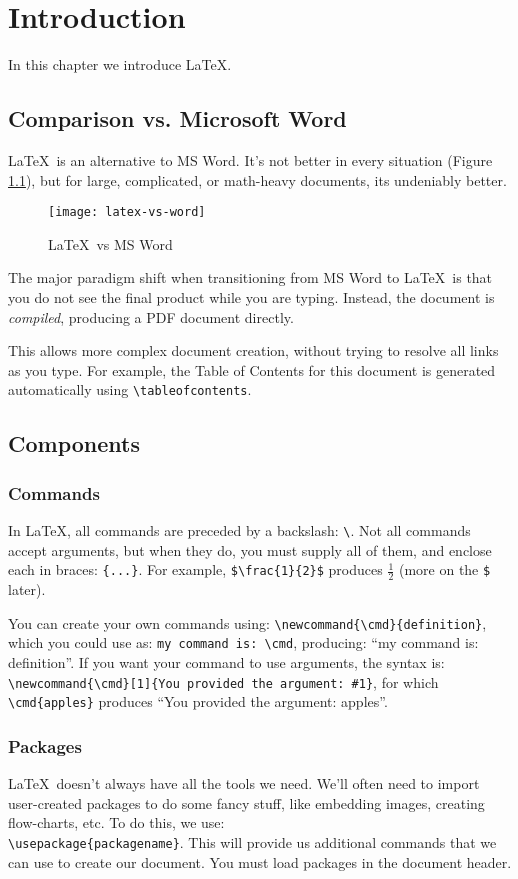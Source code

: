 \chapter{Introduction}
In this chapter we introduce \LaTeX.
\section{Comparison vs. Microsoft Word}
\LaTeX\ is an alternative to MS Word.
It's not better in every situation (Figure \ref{fig:latex-vs-word}),
but for large, complicated, or math-heavy documents,
its undeniably better.
\begin{figure}[H]
  \centering\texttt{[image: latex-vs-word]}
  \caption{\LaTeX\ vs MS Word}%
  \label{fig:latex-vs-word}
\end{figure}
\par
The major paradigm shift when transitioning from MS Word to \LaTeX\ is that
you do not see the final product while you are typing.
Instead, the document is \textit{compiled},
producing a PDF document directly.
\par
This allows more complex document creation,
without trying to resolve all links as you type.
For example, the Table of Contents for this document is generated automatically using
\lstinline|\tableofcontents|.
\section{Components}
\subsection{Commands}
In \LaTeX, all commands are preceded by a backslash: \lstinline|\|.
Not all commands accept arguments, but when they do, you must supply all of them,
and enclose each in braces: \lstinline|{...}|.
For example, \lstinline|$\frac{1}{2}$| produces $\frac{1}{2}$ (more on the \lstinline|$| later).
\par
You can create your own commands using:
\lstinline|\newcommand{\cmd}{definition}|,
which you could use as:
\lstinline|my command is: \cmd|,
producing:
``my command is: definition''.
If you want your command to use arguments, the syntax is:
\lstinline|\newcommand{\cmd}[1]{You provided the argument: #1}|,
for which
\lstinline|\cmd{apples}|
produces
``You provided the argument: apples''.
\subsection{Packages}
\LaTeX\ doesn't always have all the tools we need.
We'll often need to import user-created packages to do some fancy stuff,
like embedding images, creating flow-charts, etc.
To do this, we use:\\
\lstinline|\usepackage{packagename}|.
This will provide us additional commands that we can use to create our document.
You must load packages in the document header.
